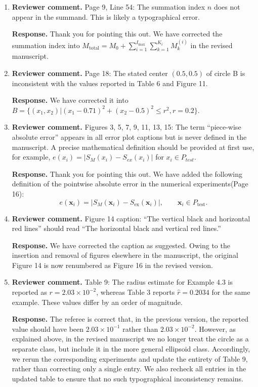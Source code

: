\documentclass[11pt]{article}
\newcommand{\reviewer}[1]{\vspace{0.4em}\noindent\textbf{Reviewer comment.} #1}
\newcommand{\response}[1]{\vspace{0.2em}\noindent\textbf{Response.} #1}
\begin{document}
\begin{enumerate}[label=(\alph*)]

\item \reviewer{Page 9, Line 54: The summation index $n$ does not appear in the summand. This is likely a typographical error.}

\response{Thank you for pointing this out. We have corrected the summation index into $M_{\text{total}} = M_0 + \sum_{i=1}^{I_{\text{max}}} \sum_{k=1}^{K_i} M_k^{(i)}$ in the revised manuscript.}

\item \reviewer{Page 18: The stated center $(0.5,0.5)$ of circle B is inconsistent with the values reported in Table 6 and Figure 11.}

\response{We have corrected it into $B=\{(x_1, x_2)| (x_1-0.71)^2+(x_2-0.5)^2 \leq r^2 ,  r=0.2\}$.}

\item \reviewer{Figures 3, 5, 7, 9, 11, 13, 15: The term ``piece-wise absolute error'' appears in all error plot captions but is never defined in the manuscript. A precise mathematical definition should be provided at first use, for example, $e(x_i)=|S_M(x_i)-S_{ex}(x_i)|$ for $x_i\in P_{test}$.}

\response{Thank you for pointing this out. We have added the following definition of the pointwise absolute error in the numerical experiments(Page 16):
\[
    e(\mathbf{x}_i)=|S_M(\mathbf{x}_i)-S_{\text{ex}}(\mathbf{x}_i)|,\qquad \mathbf{x}_i \in P_{\text{test}}.
\]}

\item \reviewer{Figure 14 caption: ``The vertical black and horizontal red lines'' should read ``The horizontal black and vertical red lines.''}

\response{We have corrected the caption as suggested. Owing to the insertion and removal of figures elsewhere in the manuscript, the original Figure 14 is now renumbered as Figure 16 in the revised version.}

\item \reviewer{Table 9: The radius estimate for Example 4.3 is reported as $r=2.03\times 10^{-2}$, whereas Table 3 reports $\hat r=0.2034$ for the same example. These values differ by an order of magnitude.}

\response{The referee is correct that, in the previous version, the reported value should have been $2.03\times 10^{-1}$ rather than $2.03\times 10^{-2}$. 
However, as explained above, in the revised manuscript we no longer treat the circle as a separate class, but include it in the more general ellipsoid class.
 Accordingly, we rerun the corresponding experiments and update the entirety of Table 9, rather than correcting only a single entry. We also recheck all entries in the updated table to ensure that no such typographical inconsistency remains.}


\end{enumerate}
\end{document}
